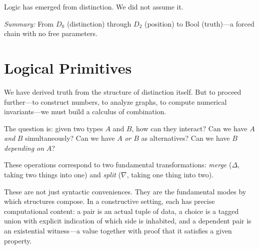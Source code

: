 \documentclass[11pt,a4paper]{book}
\begin{document}
Logic has emerged from distinction. We did not assume it.

\medskip
\noindent\textit{Summary:} From $D_0$ (distinction) through $D_2$ (position) to Bool (truth)—a forced chain with no free parameters.

\chapter{Logical Primitives}

We have derived truth from the structure of distinction itself. But to proceed 
further—to construct numbers, to analyze graphs, to compute numerical invariants—we 
must build a calculus of combination.

The question is: given two types $A$ and $B$, how can they interact? Can we have 
$A$ \emph{and} $B$ simultaneously? Can we have $A$ \emph{or} $B$ as alternatives? 
Can we have $B$ \emph{depending on} $A$?

These operations correspond to two fundamental transformations: \emph{merge} 
($\Delta$, taking two things into one) and \emph{split} ($\nabla$, taking one 
thing into two).

\begin{center}
\end{center}

These are not just syntactic conveniences. They are the fundamental modes by which 
structures compose. In a constructive setting, each has precise computational content: 
a pair is an actual tuple of data, a choice is a tagged union with explicit indication 
of which side is inhabited, and a dependent pair is an existential witness—a value 
together with proof that it satisfies a given property.
\end{document}
